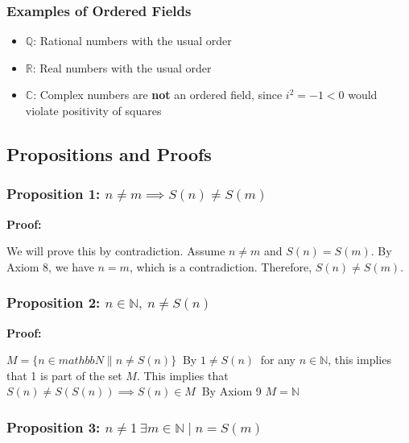 \subsubsection{Examples of Ordered Fields}

\begin{itemize}[label=\(-\)]
    \item \( \mathbb{Q} \): Rational numbers with the usual order
    \item \( \mathbb{R} \): Real numbers with the usual order
    \item \( \mathbb{C} \): Complex numbers are \textbf{not} an ordered field, since \( i^2 = -1 < 0 \) would violate positivity of squares
\end{itemize}


\subsection{Propositions and Proofs}

\subsubsection{Proposition 1: \texorpdfstring{\(n \ne m \implies S(n) \ne S(m)\)}{n!= m implies S (n)!=S (m)}}

\textbf{Proof:} 

We will prove this by contradiction. Assume \( n \ne m \) and \( S(n) = S(m) \). By Axiom 8, we have \( n = m \), which is a contradiction. Therefore, \( S(n) \ne S(m) \).

\subsubsection{Proposition 2: \texorpdfstring{ \(n \in \mathbb{N},\ n \ne S(n)\)}{For any n in N, n!= S (n)}}

\textbf{Proof:} 

\(M = \{n \in mathbb{N} \| n \ne S(n) \}\ \)
By \(1 \ne S(n)\ \) for any \(n \in \mathbb{N}\), this implies that 1 is part of the set \(M\). This implies that \(S(n) \ne S(S(n)) \implies S(n) \in M\ \) By Axiom 9 \(M = \mathbb{N}\)

\subsubsection{Proposition 3: \texorpdfstring{\(n \ne 1\ \exists m \in \mathbb{N} \mid n = S(m)\)}{n!= 1, exists m in N | n = S (m)}}


